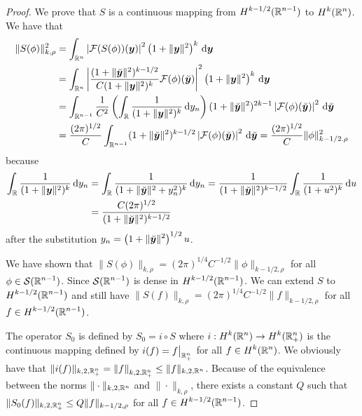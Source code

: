 \begin{proof}
We prove that $S$ is a continuous mapping from
$\displaystyle H^{k-1/2}(\mathbb{R}^{n-1})$ to $\displaystyle H^k(\mathbb{R}^n)$.
We have that
\begin{align*}
\|S(\phi)\|_{k,\rho}^2
&= \int_{\mathbb{R}^n} \left| \mathcal{F}(S(\phi))({\bm{y}}) \right|^2
\left( 1 + \|{\bm{y}}\|^2\right)^k \,\mathrm{d}{{\bm{y}}} \\
&= \int_{\mathbb{R}^n} \left|
\frac{(1+\|\breve{{\bm{y}}}\|^2)^{k-1/2}}{C (1+ \|{\bm{y}}\|^2)^k}
\mathcal{F}(\phi)(\breve{{\bm{y}}}) \right|^2
\left( 1 + \|{\bm{y}}\|^2\right)^k \,\mathrm{d}{{\bm{y}}} \\
&= \int_{\mathbb{R}^{n-1}} \frac{1}{C^2} \left( \int_{\mathbb{R}}
\frac{1}{(1+ \|{\bm{y}}\|^2)^k} \,\mathrm{d}{y_n} \right)
(1+\|\breve{{\bm{y}}}\|^2)^{2k-1} \left| \mathcal{F}(\phi)(\breve{{\bm{y}}}) \right|^2
\,\mathrm{d}{\breve{{\bm{y}}}} \\
&= \frac{(2\pi)^{1/2}}{C} \int_{\mathbb{R}^{n-1}}
(1+\|\breve{{\bm{y}}}\|^2)^{k-1/2} \left| \mathcal{F}(\phi)(\breve{{\bm{y}}}) \right|^2
\,\mathrm{d}{\breve{{\bm{y}}}} = \frac{(2\pi)^{1/2}}{C} \|\phi\|_{k-1/2.\rho}^2
\end{align*}
because
\begin{align}
\int_{\mathbb{R}} \frac{1}{(1 + \|{\bm{y}}\|^2)^k} \,\mathrm{d}{y_n}
&= \int_{\mathbb{R}} \frac{1}{(1 + \|\breve{{\bm{y}}}\|^2 + y_n^2)^k} \,\mathrm{d}{y_n}
= \frac{1}{(1 + \|\breve{{\bm{y}}}\|^2)^{k-1/2}}
\int_{\mathbb{R}} \frac{1}{(1 + u^2)^k} \,\mathrm{d}{u} \nonumber \\
&= \frac{C (2\pi)^{1/2}}{(1 + \|\breve{{\bm{y}}}\|^2)^{k-1/2}}
\label{TraceT0Eq1}
\end{align}
after the substitution
$\displaystyle y_n = \left(1 + \|\breve{{\bm{y}}}\|^2\right)^{1/2} u$.

We have shown that
$\displaystyle \|S(\phi)\|_{k,\rho}
= (2\pi)^{1/4} C^{-1/2} \|\phi\|_{k-1/2,\rho}$
for all $\displaystyle \phi \in \mathcal{S}(\mathbb{R}^{n-1})$.
Since $\displaystyle \mathcal{S}(\mathbb{R}^{n-1})$ is dense in
$\displaystyle H^{k-1/2}(\mathbb{R}^{n-1})$.  We can
extend $S$ to $\displaystyle H^{k-1/2}(\mathbb{R}^{n-1})$ and still
have
$\displaystyle \|S(f)\|_{k,\rho} = (2\pi)^{1/4} C^{-1/2} \|f\|_{k-1/2,\rho}$
for all $\displaystyle f \in H^{k-1/2}(\mathbb{R}^{n-1})$.

The operator $S_0$ is defined by $S_0 = i \circ S$ where
$\displaystyle i: H^{k}(\mathbb{R}^n) \to H^{k}(\mathbb{R}^n_+)$ is the
continuous mapping defined by $\displaystyle i(f) = f\big|_{\mathbb{R}^n_+}$ for all
$\displaystyle f \in H^{k}(\mathbb{R}^n)$.  We obviously have that
$\displaystyle \|i(f)\|_{k,2,\mathbb{R}^n_+} = \left\|f\right\|_{k,2,\mathbb{R}^n_+}
\leq \|f \|_{k,2,\mathbb{R}^n}$.  Because of the equivalence between the
norms $\|\cdot\|_{k,2,\mathbb{R}^n}$ and $\|\cdot\|_{k,\rho}$, there exists a
constant $Q$ such that
$\displaystyle \|S_0(f)\|_{k,2,\mathbb{R}^n_+} \leq Q \|f\|_{k-1/2,\rho}$ for all
$\displaystyle f \in H^{k-1/2}(\mathbb{R}^{n-1})$.


\end{proof}
